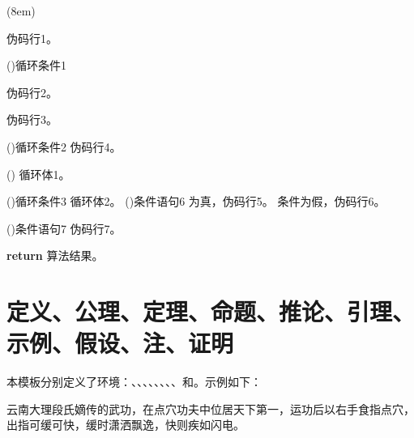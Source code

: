 \begin{algo}[!h](8em)
    \renewcommand{\algorithmcfname}{过程}  %
    \caption{algo环境临时修改伪码标签并调整宽度示例} \label{alg: algo环境修改伪码标签并调整宽度示例}
    伪码行1。
    
    \For(){循环条件1}{
        伪码行2。
        
        伪码行3。
        
        \DoWhile(){循环条件2}{
            伪码行4。
        }
        
        \Loop(){
            循环体1。
        }
        
        \Repeat(){循环条件3}{
            循环体2。
        }
        \eIf(){条件语句6}{
            为真，伪码行5。
        }{
            条件为假，伪码行6。
        }
        
        \If(){条件语句7}{
            伪码行7。
        }
    }
    \textbf{return} 算法结果。
\end{algo}

\clearpage
\section{定义、公理、定理、命题、推论、引理、示例、假设、注、证明}

本模板分别定义了环境：、、、、、、、、和。示例如下：




\begin{axiom}[具体名称]
    云南大理段氏嫡传的武功，在点穴功夫中位居天下第一，运功后以右手食指点穴，出指可缓可快，缓时潇洒飘逸，快则疾如闪电。
\end{axiom}

